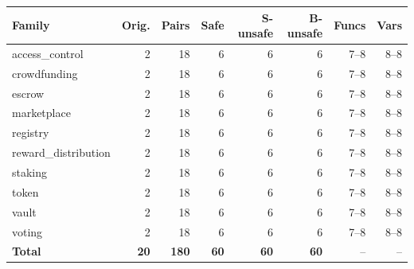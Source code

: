 \begin{tabular}{lrrrrrrr}
\toprule
Family & Orig. & Pairs & Safe & S-unsafe & B-unsafe & Funcs & Vars \\
\midrule
access\_control & 2 & 18 & 6 & 6 & 6 & 7--8 & 8--8 \\
crowdfunding & 2 & 18 & 6 & 6 & 6 & 7--8 & 8--8 \\
escrow & 2 & 18 & 6 & 6 & 6 & 7--8 & 8--8 \\
marketplace & 2 & 18 & 6 & 6 & 6 & 7--8 & 8--8 \\
registry & 2 & 18 & 6 & 6 & 6 & 7--8 & 8--8 \\
reward\_distribution & 2 & 18 & 6 & 6 & 6 & 7--8 & 8--8 \\
staking & 2 & 18 & 6 & 6 & 6 & 7--8 & 8--8 \\
token & 2 & 18 & 6 & 6 & 6 & 7--8 & 8--8 \\
vault & 2 & 18 & 6 & 6 & 6 & 7--8 & 8--8 \\
voting & 2 & 18 & 6 & 6 & 6 & 7--8 & 8--8 \\
\textbf{Total} & \textbf{20} & \textbf{180} & \textbf{60} & \textbf{60} & \textbf{60} & -- & -- \\
\bottomrule
\end{tabular}
